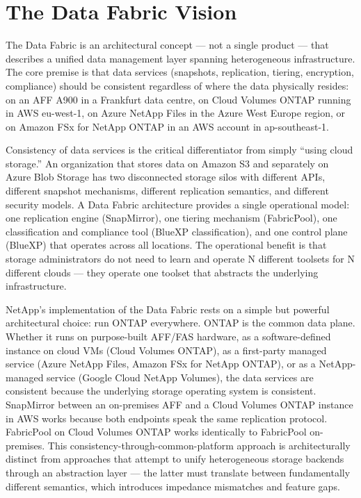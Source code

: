 \section{The Data Fabric Vision}

The Data Fabric is an architectural concept --- not a single product --- that
describes a unified data management layer spanning heterogeneous
infrastructure. The core premise is that data services (snapshots, replication,
tiering, encryption, compliance) should be consistent regardless of where the
data physically resides: on an AFF A900 in a Frankfurt data centre, on Cloud
Volumes ONTAP running in AWS eu-west-1, on Azure NetApp Files in the Azure
West Europe region, or on Amazon FSx for NetApp ONTAP in an AWS account in
ap-southeast-1.

Consistency of data services is the critical differentiator from simply
``using cloud storage.'' An organization that stores data on Amazon S3 and
separately on Azure Blob Storage has two disconnected storage silos with
different APIs, different snapshot mechanisms, different replication semantics,
and different security models. A Data Fabric architecture provides a single
operational model: one replication engine (SnapMirror), one tiering mechanism
(FabricPool), one classification and compliance tool (BlueXP classification),
and one control plane (BlueXP) that operates across all locations. The
operational benefit is that storage administrators do not need to learn and
operate N different toolsets for N different clouds --- they operate one
toolset that abstracts the underlying infrastructure.

NetApp's implementation of the Data Fabric rests on a simple but powerful
architectural choice: run ONTAP everywhere. ONTAP is the common data plane.
Whether it runs on purpose-built AFF/FAS hardware, as a software-defined
instance on cloud VMs (Cloud Volumes ONTAP), as a first-party managed service
(Azure NetApp Files, Amazon FSx for NetApp ONTAP), or as a NetApp-managed
service (Google Cloud NetApp Volumes), the data services are consistent because
the underlying storage operating system is consistent. SnapMirror between an
on-premises AFF and a Cloud Volumes ONTAP instance in AWS works because both
endpoints speak the same replication protocol. FabricPool on Cloud Volumes
ONTAP works identically to FabricPool on-premises. This
consistency-through-common-platform approach is architecturally distinct from
approaches that attempt to unify heterogeneous storage backends through an
abstraction layer --- the latter must translate between fundamentally different
semantics, which introduces impedance mismatches and feature gaps.

